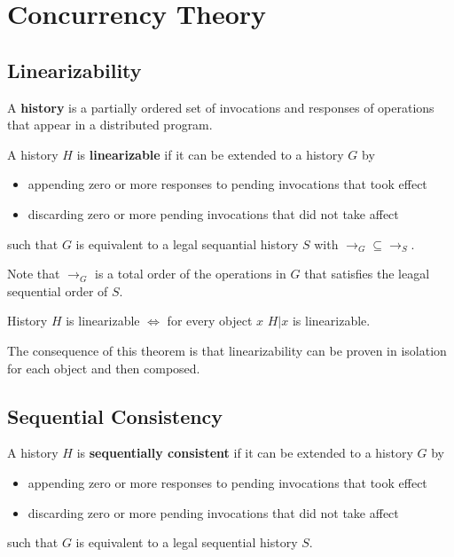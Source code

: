 \section{Concurrency Theory}

\subsection{Linearizability}

\begin{definition}
    A \textbf{history} is a partially ordered set of invocations and responses of operations that appear in a distributed program. 
\end{definition}

\begin{definition}
    A history $H$ is \textbf{linearizable} if it can be extended to a history $G$ by
    \begin{itemize}
        \item appending zero or more responses to pending invocations that took effect
        \item discarding zero or more pending invocations that did not take affect
    \end{itemize}
    such that $G$ is equivalent to a legal sequantial history $S$ with $\to_G \subseteq \to_S$.
\end{definition}

\begin{remark}
    Note that $\to_G$ is a total order of the operations in $G$ that satisfies the leagal sequential order of $S$.
\end{remark}

\begin{theorem}
    History $H$ is linearizable $\iff$ for every object $x$ $H | x$ is linearizable.
\end{theorem}

\begin{remark}
    The consequence of this theorem is that linearizability can be proven in isolation for each object and then composed.
\end{remark}

\subsection{Sequential Consistency}

\begin{definition}
    A history $H$ is \textbf{sequentially consistent} if it can be extended to a history $G$ by
    \begin{itemize}
        \item appending zero or more responses to pending invocations that took effect
        \item discarding zero or more pending invocations that did not take affect
    \end{itemize}
    such that $G$ is equivalent to a legal sequential history $S$.
\end{definition}

